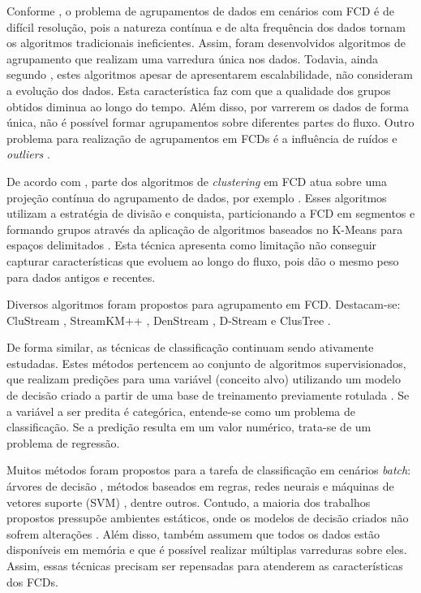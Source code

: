 \documentclass[qual, classic, a4paper]{ufbathesis}
\begin{document}
Conforme \cite{Aggarwal:2003:FCE:1315451.1315460}, o problema de agrupamentos de dados em cenários com FCD é de difícil resolução,
pois a natureza contínua e de alta frequência dos dados tornam os algoritmos tradicionais ineficientes.
Assim, foram desenvolvidos algoritmos de agrupamento que realizam uma varredura única nos dados. 
Todavia, ainda segundo \cite{Aggarwal:2003:FCE:1315451.1315460}, estes algoritmos apesar de apresentarem escalabilidade, 
não consideram a evolução dos dados. 
Esta característica faz com que a qualidade dos grupos obtidos diminua ao longo do tempo.
Além disso, por varrerem os dados de forma única, não é possível formar agrupamentos sobre diferentes partes do fluxo.
Outro problema para realização de agrupamentos em FCDs é a influência de ruídos e \textit{outliers} \cite{Khalilian:DBLP:journals/corr/abs-1006-5261}.

De acordo com \cite{Chen:Tu}, 
parte dos algoritmos de \textit{clustering} em FCD atua sobre uma projeção contínua do agrupamento de dados, por exemplo \cite{Guha:2003:CDS:776752.776777}.
Esses algoritmos utilizam a estratégia de divisão e conquista, particionando a FCD em segmentos e 
formando grupos através da aplicação de algoritmos baseados no K-Means para espaços delimitados \cite{Guha:2000:CDS:795666.796588}.
Esta técnica apresenta como limitação não conseguir capturar características que evoluem ao longo do fluxo, 
pois dão o mesmo peso para dados antigos e recentes.
 
Diversos algoritmos foram propostos para agrupamento em FCD. 
Destacam-se: 
CluStream \cite{Aggarwal:2003:FCE:1315451.1315460},
StreamKM++ \cite{Ackermann:2012:SCA:2133803.2184450},
DenStream \cite{Cao:Feng:Ester},
D-Stream \cite{Chen:Tu} e ClusTree \cite{Kranen:2011:CIM:2134350.2134352}.

De forma similar, as técnicas de classificação continuam sendo ativamente estudadas.
Estes métodos pertencem ao conjunto de algoritmos supervisionados, 
que realizam predições para uma variável (conceito alvo) utilizando um modelo de decisão criado a partir de uma base de treinamento previamente rotulada \cite{Kotsiantis:2007:SML:1566770.1566773}.
Se a variável a ser predita é categórica, entende-se como um problema de classificação.
Se a predição resulta em um valor numérico, trata-se de um problema de regressão.

Muitos métodos foram propostos para a tarefa de classificação em cenários \textit{batch}:
árvores de decisão \cite{Breiman:Classification_Regression_Trees},
métodos baseados em regras, 
redes neurais e máquinas de vetores suporte (SVM) \cite{Vapnik1998}, 
dentre outros.
Contudo, a maioria dos trabalhos propostos pressupõe ambientes estáticos, onde os modelos de decisão criados não sofrem alterações \cite{Aggarwal:2006:DSM:1196418}.
Além disso, também assumem que todos os dados estão disponíveis em memória e que é possível realizar múltiplas varreduras sobre eles.
Assim, essas técnicas precisam ser repensadas para atenderem as características dos FCDs.
\end{document}
